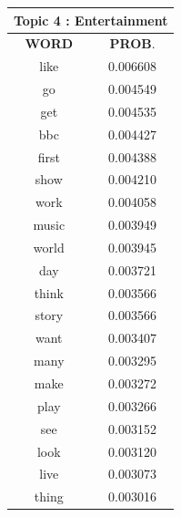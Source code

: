 \begin{table}[h!]
\centering
\begin{tabular}{|c c|} 
\hline
\multicolumn{2}{|c|}{\textbf{Topic 4 : Entertainment}} \\
\hline
 \textbf{WORD} & \textbf{PROB}.  \\ [0.3ex] 
 \hline
 	like  &   0.006608  \\ 
	go   &  0.004549  \\ 
	get   &  0.004535  \\ 
	bbc   &  0.004427  \\ 
	first   &  0.004388  \\ 
	show   &  0.004210  \\ 
	work   &  0.004058  \\ 
	music   &  0.003949  \\ 
	world   &  0.003945  \\ 
	day   &  0.003721  \\ 
	think  &   0.003566  \\ 
	story  &   0.003566  \\ 
	want   &  0.003407  \\ 
	many   &  0.003295  \\ 
	make   &  0.003272  \\ 
	play   &  0.003266  \\ 
	see   &  0.003152  \\ 
	look   &  0.003120  \\ 
	live   &  0.003073  \\ 
	thing  &   0.003016 \\ [1ex] 
 \hline
  

\end{tabular}
\end{table}
